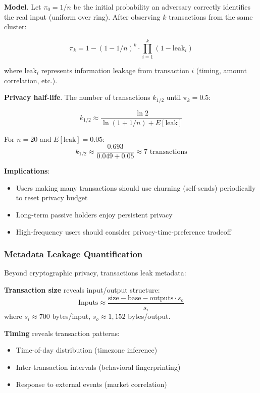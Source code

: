 \textbf{Model}. Let $\pi_0 = 1/n$ be the initial probability an adversary
correctly identifies the real input (uniform over ring). After observing
$k$ transactions from the same cluster:

\begin{equation}
\pi_k = 1 - (1 - 1/n)^k \cdot \prod_{i=1}^{k} (1 - \text{leak}_i)
\end{equation}

where $\text{leak}_i$ represents information leakage from transaction $i$
(timing, amount correlation, etc.).

\textbf{Privacy half-life}. The number of transactions $k_{1/2}$ until
$\pi_k = 0.5$:

\begin{equation}
k_{1/2} \approx \frac{\ln 2}{\ln(1 + 1/n) + E[\text{leak}]}
\end{equation}

For $n = 20$ and $E[\text{leak}] = 0.05$:
\[
k_{1/2} \approx \frac{0.693}{0.049 + 0.05} \approx 7 \text{ transactions}
\]

\textbf{Implications}:
\begin{itemize}
  \item Users making many transactions should use churning (self-sends)
    periodically to reset privacy budget
  \item Long-term passive holders enjoy persistent privacy
  \item High-frequency users should consider privacy-time-preference tradeoff
\end{itemize}

\subsubsection{Metadata Leakage Quantification}

Beyond cryptographic privacy, transactions leak metadata:

\textbf{Transaction size} reveals input/output structure:
\begin{equation}
\text{Inputs} \approx \frac{\text{size} - \text{base} - \text{outputs} \cdot s_o}{s_i}
\end{equation}
where $s_i \approx 700$ bytes/input, $s_o \approx 1,152$ bytes/output.

\textbf{Timing} reveals transaction patterns:
\begin{itemize}
  \item Time-of-day distribution (timezone inference)
  \item Inter-transaction intervals (behavioral fingerprinting)
  \item Response to external events (market correlation)
\end{itemize}

